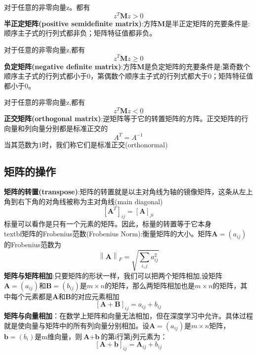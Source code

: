 \documentclass[openbib]{article}
\begin{document}
对于任意的非零向量z。都有$$z^T\textbf{M}z>0$$
\textbf{半正定矩阵(positive semidefinite matrix)}:方阵\textbf{M}是半正定矩阵的充要条件是:顺序主子式的行列式都非负；矩阵特征值都非负。

对于任意的非零向量z,都有$$z^T\textbf{M}z\ge0$$
\textbf{负定矩阵(negative definite matrix)}:方阵\textbf{M}是负定矩阵的充要条件是:第奇数个顺序主子式的行列式都小于0，第偶数个顺序主子式的行列式都大于0；矩阵特征值都小于0。

对于任意的非零向量z,都有$$z^T\textbf{M}z<0$$
\textbf{正交矩阵(orthogonal matrix)}:逆矩阵等于它的转置矩阵的方阵。正交矩阵的行向量和列向量分别都是标准正交的
$$A^{T}=A^{-1}$$
当其范数为1时，我们称它们是标准正交(orthonormal)
\subsection{矩阵的操作}
\textbf{矩阵的转置(transpose)}:矩阵的转置就是以主对角线为轴的镜像矩阵，这条从左上角到右下角的对角线被称为主对角线(main diagonal)
$$[\textbf{A}^T]_{ij}=[\textbf{A}]_{ji}$$
标量可以看作是只有一个元素的矩阵。因此，标量的转置等于它本身
\\textbf{矩阵的Frobenius范数(Frobenius Norm)}:衡量矩阵的大小。矩阵$\textbf{A}=(a_{ij})$的Frobenius范数为
$$\left\| \textbf{A} \right\|_{F}=\sqrt{\sum_{i,j}^{}a_{ij}^2}$$
\textbf{矩阵与矩阵相加}:只要矩阵的形状一样，我们可以把两个矩阵相加,设矩阵$\textbf{A}=(a_{ij})$和$\textbf{B}=(b_{ij})$是$m\times n$的矩阵，那么两矩阵相加也是$m\times n$的矩阵，其中每个元素都是\textbf{A}和\textbf{B}的对应元素相加
$$[\textbf{A}+\textbf{B}]_{ij}=a_{ij}+b_{ij}$$
\textbf{矩阵与向量相加}：在数学上矩阵和向量无法相加，但在深度学习中允许。具体过程就是使向量与矩阵中的所有列向量分别相加。设$\textbf{A}=(a_{ij})$是$m\times n$矩阵，$\textbf{b}=(b_i)$是m维向量，则$\textbf{A}+\textbf{b}$的第i行第j列元素为：
$$[\textbf{A}+\textbf{b}]_{ij}=\textbf{A}_{ij}+b_{ij}$$
\end{document}
